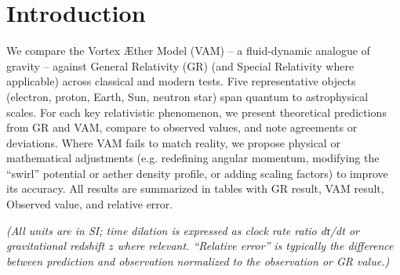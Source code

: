 \section*{Introduction}

We compare the Vortex Æther Model (VAM) – a fluid-dynamic analogue of gravity – against General Relativity (GR) (and Special Relativity where applicable) across classical and modern tests. Five representative objects (electron, proton, Earth, Sun, neutron star) span quantum to astrophysical scales. For each key relativistic phenomenon, we present theoretical predictions from GR and VAM, compare to observed values, and note agreements or deviations. Where VAM fails to match reality, we propose physical or mathematical adjustments (e.g. redefining angular momentum, modifying the “swirl” potential or aether density profile, or adding scaling factors) to improve its accuracy. All results are summarized in tables with GR result, VAM result, Observed value, and relative error.


\textit{(All units are in SI; time dilation is expressed as clock rate ratio dτ/dt or gravitational redshift $z$ where relevant. “Relative error” is typically the difference between prediction and observation normalized to the observation or GR value.)}



